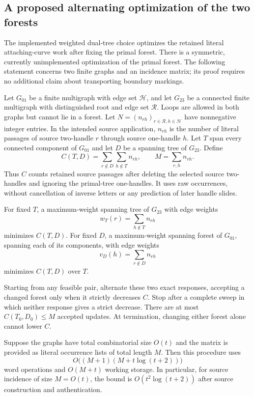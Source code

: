 \subsection{A proposed alternating optimization of the two forests}
\label{sec:paired-forests}

The implemented weighted dual-tree choice optimizes the retained literal
attaching-curve work after fixing the primal forest. There is a symmetric,
currently unimplemented optimization of the primal forest. The following
statement concerns two finite graphs and an incidence matrix; its proof
requires no additional claim about transporting boundary markings.

Let $G_{01}$ be a finite multigraph with edge set $\mathcal H$, and let
$G_{23}$ be a connected finite multigraph with distinguished root and edge
set $\mathcal R$. Loops are allowed in both graphs but cannot lie in a
forest. Let $N=(n_{rh})_{r\in\mathcal R,h\in\mathcal H}$ have nonnegative
integer entries. In the intended source application, $n_{rh}$ is the
number of literal passages of source two-handle $r$ through source
one-handle $h$. Let $T$ span every connected component of $G_{01}$ and let
$D$ be a spanning tree of $G_{23}$. Define
\[
 C(T,D)=\sum_{r\notin D}\sum_{h\notin T}n_{rh},
 \qquad M=\sum_{r,h}n_{rh}.
\]
Thus $C$ counts retained source passages after deleting the selected
source two-handles and ignoring the primal-tree one-handles. It uses raw
occurrences, without cancellation of inverse letters or any prediction of
later handle slides.

\begin{proposition}
\label{prop:paired-forests}
For fixed $T$, a maximum-weight spanning tree of $G_{23}$ with edge
weights
\[
 w_T(r)=\sum_{h\notin T}n_{rh}
\]
minimizes $C(T,D)$. For fixed $D$, a maximum-weight spanning forest of
$G_{01}$, spanning each of its components, with edge weights
\[
 v_D(h)=\sum_{r\notin D}n_{rh}
\]
minimizes $C(T,D)$ over $T$.

Starting from any feasible pair, alternate these two exact responses,
accepting a changed forest only when it strictly decreases $C$. Stop after
a complete sweep in which neither response gives a strict decrease. There
are at most $C(T_0,D_0)\le M$ accepted updates. At termination, changing
either forest alone cannot lower $C$.

Suppose the graphs have total combinatorial size $O(t)$ and the matrix is
provided as literal occurrence lists of total length $M$. Then this
procedure uses
\[
 O\bigl((M+1)(M+t\log(t+2))\bigr)
\]
word operations and $O(M+t)$ working storage. In particular, for source
incidence of size $M=O(t)$, the bound is $O(t^2\log(t+2))$ after source
construction and authentication.
\end{proposition}

